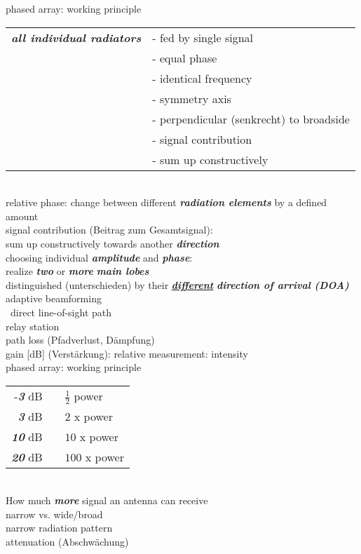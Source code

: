 \documentclass[
	final,
	a4paper,
	oneside,
	parskip=full,
	headings=standardclasses,
	headings=big,
	pointednumbers
]{scrartcl}
\newcommand{\bi}[1]{\textit{\textbf{#1}}}
\begin{document}
    phased array: working principle \\
    \begin{tabular}{p{5cm}p{8.5cm}}
        \bi{all individual radiators}   & - fed by single signal \\
                                        & - equal phase \\
                                        & - identical frequency \\
                                        & - symmetry axis \\
                                        & - perpendicular (senkrecht) to broadside \\
                                        & - signal contribution \\
                                        & - sum up constructively
    \end{tabular} \\
    relative phase: change between different \bi{radiation elements} by a defined amount \\
    signal contribution (Beitrag zum Gesamtsignal): \\
    sum up constructively towards another \bi{direction} \\
    choosing individual \bi{amplitude} and \bi{phase}: \\
    realize \bi{two} or \bi{more} \bi{main lobes} \\
    distinguished (unterschieden) by their \uline{\bi{different}} \bi{direction of arrival (DOA)} \\
    adaptive beamforming \\\
    direct line-of-sight path \\
    relay station \\
    path loss (Pfadverlust, Dämpfung) \\
    gain [dB] (Verstärkung): relative measurement: intensity \\

    phased array: working principle \\
    \begin{tabular}{rrp{5cm}}
        -\bi{3} dB  &\quad\;& $\frac{1}{2}$ power\\
        \bi{3} dB   &\quad\;& $2$ x power\\
        \bi{10} dB  &\quad\;& $10$ x power \\
        \bi{20} dB  &\quad\;& $100$ x power
    \end{tabular} \\
    How much \bi{more} signal an antenna can receive \\
    narrow vs. wide/broad \\
    narrow radiation pattern \\
    attenuation (Abschwächung)
\end{document}
